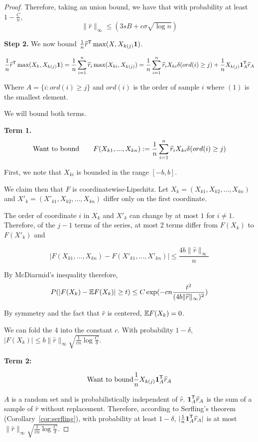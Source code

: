 \begin{proof}
Therefore, taking an union bound, we have that with probability at least $1-\frac{C}{n}$, 
\[
\| \hat{r} \|_\infty \leq (3 s B + c\sigma\sqrt{\log n}) 
\]


\textbf{Step 2.} We now bound $\frac{1}{n} \widehat{r}^{\mathsf{T}} \max( X, X_{k(j)} \mbox{\boldmath $1$})$.

\[
\frac{1}{n} \widehat{r}^{\mathsf{T}} \max(X_k, X_{k(j)} \mbox{\boldmath $1$}) = \frac{1}{n} \sum_{i=1}^n \widehat{r}_i \max(X_{ki}, X_{k(j)}) = \frac{1}{n} \sum_{i=1}^n \widehat{r}_i X_{ki} \delta(ord(i) \geq j) + \frac{1}{n} X_{k(j)} \mbox{\boldmath $1$}_A^{\mathsf{T}} \widehat{r}_A
\]

Where $A = \{ i : ord(i) \geq j\}$ and $ord(i)$ is the order of sample $i$ where $(1)$ is the smallest element.

We will bound both terms.

\textbf{Term 1.}
\[
\textrm{Want to bound} \qquad F(X_{k1},...,X_{kn}) := \frac{1}{n}\sum_{i=1}^n \widehat{r}_i X_{ki} \delta(ord(i) \geq j) 
\]

First, we note that $X_{ki}$ is bounded in the range $[-b,b]$. 

We claim then that $F$ is coordinatewise-Lipschitz. Let $X_k = (X_{k1}, X_{k2},...,X_{kn})$ and $X'_k = (X'_{k1}, X_{k2}, ..., X_{kn})$ differ only on the first coordinate. 

The order of coordinate $i$ in $X_k$ and $X'_k$ can change by at most $1$ for $i \neq 1$. Therefore, of the $j-1$ terms of the series, at most 2 terms differ from $F(X_k)$ to $F(X'_k)$ and

$$ | F(X_{k1}, ..., X_{kn}) - F(X'_{k1}, ..., X'_{kn}) | \leq \frac{4 b \|\hat{r}\|_\infty}{n} $$

By McDiarmid's inequality therefore, 
\[
P( | F(X_k) - {\mathbb E} F(X_k) | \geq t ) \leq C \exp( - c n\frac{t^2}{ (4 b \|\widehat{r}\|_\infty)^2})
\]

By symmetry and the fact that $\hat{r}$ is centered, ${\mathbb E} F(X_k) = 0$.

We can fold the 4 into the constant $c$. With probability $1-\delta$, $|F(X_k)| \leq b \|\hat{r}\|_\infty \sqrt{   \frac{1}{cn} \log \frac{C}{\delta}}$. 

\textbf{Term 2:}

\[
\textrm{Want to bound}   \frac{1}{n} X_{k(j)} \mbox{\boldmath $1$}_A^{\mathsf{T}} \widehat{r}_A
\]

$A$ is a random set and is probabilistically independent of $\hat{r}$.  $\mbox{\boldmath $1$}_A^{\mathsf{T}} \widehat{r}_A$ is the sum of a sample of $\hat{r}$ without replacement. Therefore, according to Serfling's theorem (Corollary~\ref{cor:serfling}), with probability at least $1-\delta$, $|\frac{1}{n} \mbox{\boldmath $1$}_A^{\mathsf{T}} \widehat{r}_A|$ is at most $\| \hat{r} \|_\infty \sqrt{ \frac{1}{cn} \log \frac{C}{\delta}}$.


\end{proof}
